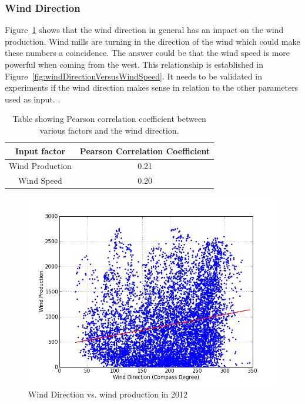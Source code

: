 \subsubsection{Wind Direction}
Figure~\ref{fig:windDirVsProd} shows that the wind direction in general has an impact on the wind production. Wind mills are turning in the direction of the wind which could make these numbers a coincidence. The answer could be that the wind speed is more powerful when coming from the west. This relationship is established in Figure~\ref{fig:windDirectionVersusWindSpeed}. It needs to be validated in experiments if the wind direction makes sense in relation to the other parameters used as input. .   
 
 \begin{table}[H]
\centering  %
\begin{tabular}{c c} %
Input factor & Pearson Correlation Coefficient \\ [0.5ex] %
\hline                  %
Wind Production & 0.21 \\ %
Wind Speed & 0.20 \\ [1ex] %
\hline %
\end{tabular}
\caption{Table showing Pearson correlation coefficient between various factors and the wind direction.} %
\label{table:pearsonCoeficientWindDirection} %
\end{table}

\begin{figure}[H]
\centering
\includegraphics[width=0.99\linewidth,natwidth=898,natheight=587]{billeder/productionVsWindDirection.png}
\caption{Wind Direction vs. wind production in 2012}
\label{fig:windDirVsProd}
\end{figure}

